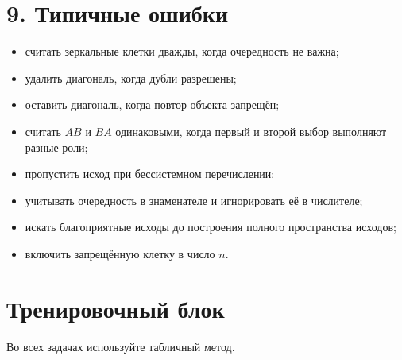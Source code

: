 \documentclass[a4paper,12pt]{article}
\begin{document}
\section*{9. Типичные ошибки}

\begin{itemize}
\item считать зеркальные клетки дважды, когда очередность не важна;
\item удалить диагональ, когда дубли разрешены;
\item оставить диагональ, когда повтор объекта запрещён;
\item считать $AB$ и $BA$ одинаковыми, когда первый и второй выбор выполняют разные роли;
\item пропустить исход при бессистемном перечислении;
\item учитывать очередность в знаменателе и игнорировать её в числителе;
\item искать благоприятные исходы до построения полного пространства исходов;
\item включить запрещённую клетку в число $n$.
\end{itemize}

\clearpage
\section*{Тренировочный блок}

Во всех задачах используйте табличный метод.
\end{document}
